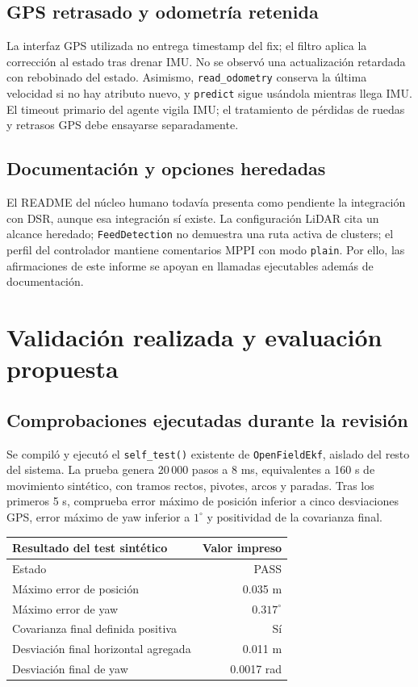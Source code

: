 \documentclass[11pt,a4paper]{article}
\newcommand{\code}[1]{\nolinkurl{#1}}
\begin{document}
\subsection{GPS retrasado y odometría retenida}
La interfaz GPS utilizada no entrega timestamp del fix; el filtro aplica la
corrección al estado tras drenar IMU. No se observó una actualización retardada con
rebobinado del estado. Asimismo, \code{read_odometry} conserva la última velocidad
si no hay atributo nuevo, y \code{predict} sigue usándola mientras llega IMU. El
timeout primario del agente vigila IMU; el tratamiento de pérdidas de ruedas y
retrasos GPS debe ensayarse separadamente.~\cite{openworker,openconfig}

\subsection{Documentación y opciones heredadas}
El README del núcleo humano todavía presenta como pendiente la integración con
DSR, aunque esa integración sí existe. La configuración LiDAR cita un alcance
heredado; \code{FeedDetection} no demuestra una ruta activa de clusters; el perfil
del controlador mantiene comentarios MPPI con modo \code{plain}. Por ello, las
afirmaciones de este informe se apoyan en llamadas ejecutables además de documentación.
\cite{humancorereadme,lidarconfig,resworker,controllerconfig}

\section{Validación realizada y evaluación propuesta}
\label{sec:tests}

\subsection{Comprobaciones ejecutadas durante la revisión}
Se compiló y ejecutó el \code{self_test()} existente de \code{OpenFieldEkf}, aislado
del resto del sistema. La prueba genera 20\,000 pasos a 8 ms, equivalentes a 160 s
de movimiento sintético, con tramos rectos, pivotes, arcos y paradas. Tras los
primeros 5 s, comprueba error máximo de posición inferior a cinco desviaciones GPS,
error máximo de yaw inferior a $1^\circ$ y positividad de la covarianza final.
\cite{ekf}

\begin{center}
\begin{tabular}{lr}
\toprule Resultado del test sintético & Valor impreso \\
\midrule
Estado & PASS \\
Máximo error de posición & 0.035 m \\
Máximo error de yaw & $0.317^\circ$ \\
Covarianza final definida positiva & Sí \\
Desviación final horizontal agregada & 0.011 m \\
Desviación final de yaw & 0.0017 rad \\
\bottomrule
\end{tabular}
\end{center}
\end{document}
